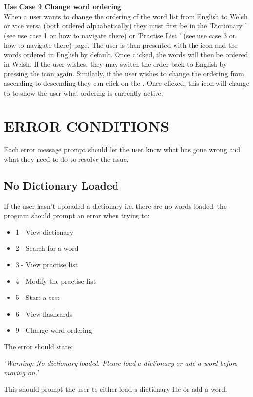 \documentclass{project}
\newcommand*{\icon}[1]{%
  \raisebox{-.3\baselineskip}{%
    \texttt{[image: \#1]}%
  }%
}
\begin{document}
\\\\
\textbf{Use Case 9 Change word ordering}
\\
When a user wants to change the ordering of the word list from English to Welsh or vice versa (both ordered alphabetically) they must first be in the 'Dictionary \icon{dictionary-icon}' (see use case 1 on how to navigate there) or 'Practise List \icon{practise-icon}' (see use case 3 on how to navigate there) page. The user is then presented with the \icon{order-icon} icon and the words ordered in English by default. Once clicked, the words will then be ordered in Welsh. If the user wishes, they may switch the order back to English by pressing the \icon{order-icon} icon again. Similarly, if the user wishes to change the ordering from ascending to descending they can click on the \icon{AZ-icon}. Once clicked, this icon will change to \icon{ZA-icon} to show the user what ordering is currently active.
\\

\section{ERROR CONDITIONS}
Each error message prompt should let the user know what has gone wrong and what they need to do to resolve the issue.
\subsection{No Dictionary Loaded}
If the user hasn't uploaded a dictionary i.e. there are no words loaded, the program should prompt an error when trying to:
\begin{itemize}
	\item 1 - View dictionary
	\item 2 - Search for a word
	\item 3 - View practise list
	\item 4 - Modify the practise list
	\item 5 - Start a test
	\item 6 - View flashcards
	\item 9 - Change word ordering
\end{itemize}
The error should state:
\begin{center}
	\emph{'Warning: No dictionary loaded. Please load a dictionary or add a word before moving on.'}
\end{center}
This should prompt the user to either load a dictionary file or add a word.
\end{document}
